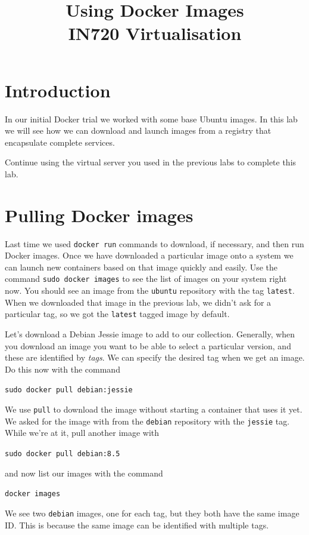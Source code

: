 \documentclass{article}
\begin{document}
\title{Using Docker Images\\ IN720 Virtualisation}
\date{}
\maketitle

\section*{Introduction}
In our initial Docker trial we worked with some base Ubuntu images.  In this lab we will see how we can download and launch images from a registry that encapsulate complete services.

Continue using the virtual server you used in the previous labs to complete this lab.

\section{Pulling Docker images}
Last time we used \texttt{docker run} commands to download, if necessary, and then run Docker images.  Once we have downloaded a particular image onto a system we can launch new containers based on that image quickly and easily.  Use the command \texttt{sudo docker images} to see the list of images on your system right now.  You should see an image from the \texttt{ubuntu} repository with the tag \texttt{latest}.  When we downloaded that image in the previous lab, we didn't ask for a particular tag, so we got the \texttt{latest} tagged image by default.

Let's download a Debian Jessie image to add to our collection.  Generally, when you download an image you want to be able to select a particular version, and these are identified by \emph{tags}.  We can specify the desired tag when we get an image.  Do this now with the command

\texttt{sudo docker pull debian:jessie}

We use \texttt{pull} to download the image without starting a container that uses it yet.  We asked for the image with from the \texttt{debian} repository with the \texttt{jessie} tag. While we're at it, pull another image with

\texttt{sudo docker pull debian:8.5}

and now list our images with the command

\texttt{docker images}

We see two \texttt{debian} images, one for each tag, but they both have the same image ID. This is because the same image can be identified with multiple tags.
\end{document}

